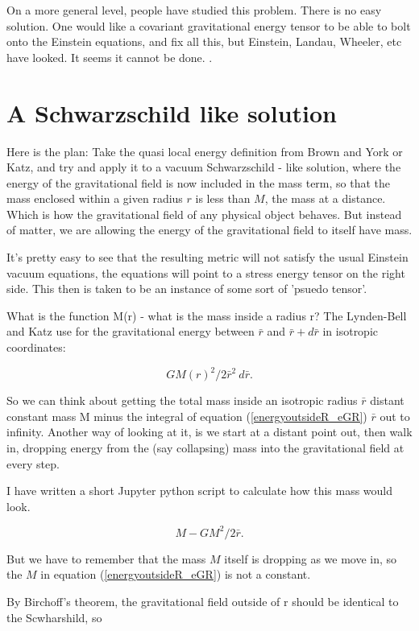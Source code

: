\documentclass[../rzero]{subfiles}
\begin{document}
On a more general level, people have studied this problem. There is no easy solution. One would like a covariant gravitational energy tensor to be able to bolt onto the Einstein equations, and fix all this, but Einstein, Landau, Wheeler, etc have looked. It seems it cannot be done.  \cite{08092323EnergyMomentumGravitational}. 


\section{A Schwarzschild like solution} 
Here is the plan: Take the quasi local energy definition from Brown and York\cite{Brown1993} or Katz\cite{Katz2005}, and try and apply it to a vacuum Schwarzschild - like solution, where the energy of the gravitational field is now included in the mass term, so that the mass enclosed within a given radius $r$ is less than $M$, the mass at a distance. Which is how the gravitational field of any physical object behaves. But instead of matter, we are allowing the energy of the gravitational field to itself have mass. 

It's pretty easy to see that the resulting metric will not satisfy the usual Einstein vacuum equations, the equations will point to a stress energy tensor on the right side. This then is taken to be an instance of some sort of 'psuedo tensor'. 

What is the function M(r) - what is the mass inside a radius r? 
The Lynden-Bell and Katz\cite{lyndenbell1985} use for the gravitational energy between  $\bar r$ and $\bar r + d \bar r$ in isotropic coordinates: 

\begin{equation} \label{energyoutsideR_eGR}
 GM(r)^2/2 \bar r^2 \ d \bar r.
\end{equation}

So we can think about getting the total mass inside an isotropic radius $\bar r$ distant constant mass M minus the integral of equation (\ref{energyoutsideR_eGR}) $\bar r$ out to infinity. Another way of looking at it, is we start at a distant point out, then walk in, dropping energy from the (say collapsing) mass into the gravitational field at every step. 

I have written a short Jupyter python script to calculate how this mass would look. 

\begin{equation} \label{energyinsideR}
 M - GM^2/2 \bar r .
\end{equation}

But we have to remember that the mass $M$ itself is dropping as we move in, so the $M$ in equation (\ref{energyoutsideR_eGR}) is not a constant. 

By Birchoff's theorem, the gravitational field outside of r should be identical to the Scwharshild, so
\end{document}
